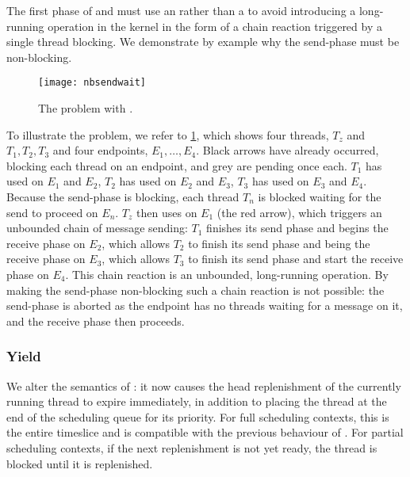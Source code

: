 The first phase of \nbsendrecv and \nbsendwait must use an \nbsend rather than a \send
to avoid introducing a long-running operation in the kernel in the form of a chain reaction
triggered by a single thread blocking. We demonstrate by example why the send-phase must be
non-blocking.

\begin{figure}
    \texttt{[image: nbsendwait]}
    \caption{The problem with \sendrecv.}
    \label{fig:send-wait}
\end{figure}

To illustrate the problem, we refer to \cref{fig:send-wait}, which shows four threads, $T_{z}$ and
$T_{1},T_{2},T_{3}$ and four endpoints, $E_{1},\dots,E_{4}$. Black arrows have already
occurred, blocking each thread on an endpoint, and grey are pending once each. $T_{1}$ has used \sendrecv on
$E_{1}$ and $E_{2}$, $T_{2}$ has used \sendrecv on $E_{2}$ and $E_{3}$,  
$T_{3}$ has used \sendrecv on $E_{3}$ and $E_{4}$. 
Because the send-phase is blocking, each thread $T_{n}$ is blocked waiting for the send to proceed 
on $E_{n}$. $T_{z}$ then uses \recv on $E_{1}$ (the red arrow), which triggers an unbounded chain of message
sending: $T_{1}$ finishes its send phase and begins the receive phase on $E_{2}$, which allows
$T_{2}$ to finish its send phase and being the receive phase on $E_{3}$, which allows $T_{3}$ to
finish its send phase and start the receive phase on $E_{4}$. This chain reaction is an
unbounded, long-running operation. By making the send-phase non-blocking such a chain reaction is not
possible: the send-phase is aborted as the endpoint has no threads waiting for a message on it, and
the receive phase then proceeds. 

\subsubsection{Yield}

We alter the semantics of \yield: it now causes the head replenishment of the currently running
thread to expire immediately, in addition to placing the thread at the end of the scheduling queue
for its priority. 
For full scheduling contexts, this is the entire timeslice and is compatible with the previous
behaviour of \yield. For partial scheduling contexts, if the next replenishment is not yet ready,
the thread is blocked until it is replenished.


